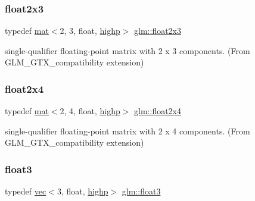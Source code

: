 \subsubsection{\texorpdfstring{float2x3}{float2x3}}
{\footnotesize\ttfamily typedef \mbox{\hyperlink{structglm_1_1mat}{mat}}$<$2, 3, float, \mbox{\hyperlink{namespaceglm_a36ed105b07c7746804d7fdc7cc90ff25ac6f7eab42eacbb10d59a58e95e362074}{highp}}$>$ \mbox{\hyperlink{group__gtx__compatibility_ga32644dc8b8177c22355e4d03b06061ac}{glm\+::float2x3}}}



single-\/qualifier floating-\/point matrix with 2 x 3 components. (From G\+L\+M\+\_\+\+G\+T\+X\+\_\+compatibility extension) 

\mbox{\label{group__gtx__compatibility_gadd10766e2393a0e0eaf91ae4d2e85f35}} 
\subsubsection{\texorpdfstring{float2x4}{float2x4}}
{\footnotesize\ttfamily typedef \mbox{\hyperlink{structglm_1_1mat}{mat}}$<$2, 4, float, \mbox{\hyperlink{namespaceglm_a36ed105b07c7746804d7fdc7cc90ff25ac6f7eab42eacbb10d59a58e95e362074}{highp}}$>$ \mbox{\hyperlink{group__gtx__compatibility_gadd10766e2393a0e0eaf91ae4d2e85f35}{glm\+::float2x4}}}



single-\/qualifier floating-\/point matrix with 2 x 4 components. (From G\+L\+M\+\_\+\+G\+T\+X\+\_\+compatibility extension) 

\mbox{\label{group__gtx__compatibility_ga8bbd0db121b50b0904f9a23adb3bbc45}} 
\subsubsection{\texorpdfstring{float3}{float3}}
{\footnotesize\ttfamily typedef \mbox{\hyperlink{structglm_1_1vec}{vec}}$<$3, float, \mbox{\hyperlink{namespaceglm_a36ed105b07c7746804d7fdc7cc90ff25ac6f7eab42eacbb10d59a58e95e362074}{highp}}$>$ \mbox{\hyperlink{group__gtx__compatibility_ga8bbd0db121b50b0904f9a23adb3bbc45}{glm\+::float3}}}




